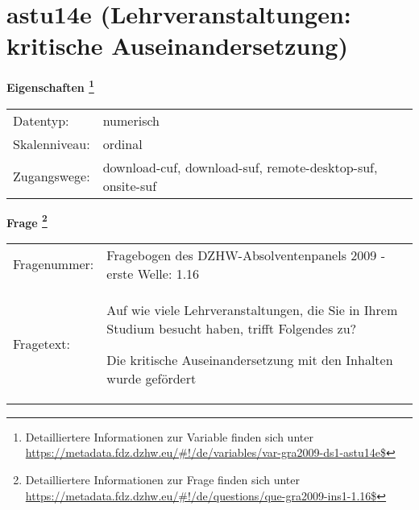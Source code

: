 
    \setcounter{footnote}{0}

    \vspace*{-1.8cm}
	\section{astu14e (Lehrveranstaltungen: kritische Auseinandersetzung)}
	\label{section:astu14e}



    \vspace*{0.5cm}
    \noindent\textbf{Eigenschaften
	\footnote{Detailliertere Informationen zur Variable finden sich unter
		\url{https://metadata.fdz.dzhw.eu/\#!/de/variables/var-gra2009-ds1-astu14e$}}}\\
	\begin{tabularx}{\hsize}{@{}lX}
	Datentyp: & numerisch \\
	Skalenniveau: & ordinal \\
	Zugangswege: &
	  download-cuf, 
	  download-suf, 
	  remote-desktop-suf, 
	  onsite-suf
 \\
    \end{tabularx}



				\vspace*{0.5cm}
                \noindent\textbf{Frage
	                \footnote{Detailliertere Informationen zur Frage finden sich unter
		              \url{https://metadata.fdz.dzhw.eu/\#!/de/questions/que-gra2009-ins1-1.16$}}}\\
				\begin{tabularx}{\hsize}{@{}lX}
					Fragenummer: &
					  Fragebogen des DZHW-Absolventenpanels 2009 - erste Welle:
					  1.16
 \\
					Fragetext: & Auf wie viele Lehrveranstaltungen, die Sie in Ihrem Studium besucht haben, trifft Folgendes zu?\par  Die kritische Auseinandersetzung mit den Inhalten wurde gefördert \\
				\end{tabularx}





